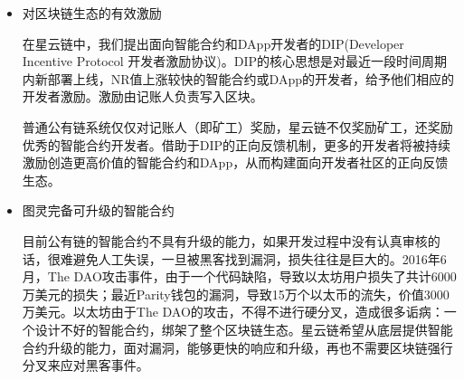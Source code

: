 \begin{itemize}
	\item 对区块链生态的有效激励

在星云链中，我们提出面向智能合约和DApp开发者的DIP(Developer Incentive Protocol 开发者激励协议)。DIP的核心思想是对最近一段时间周期内新部署上线，NR值上涨较快的智能合约或DApp的开发者，给予他们相应的开发者激励。激励由记账人负责写入区块。

普通公有链系统仅仅对记账人（即矿工）奖励，星云链不仅奖励矿工，还奖励优秀的智能合约开发者。借助于DIP的正向反馈机制，更多的开发者将被持续激励创造更高价值的智能合约和DApp，从而构建面向开发者社区的正向反馈生态。

	\item 图灵完备可升级的智能合约

目前公有链的智能合约不具有升级的能力，如果开发过程中没有认真审核的话，很难避免人工失误，一旦被黑客找到漏洞，损失往往是巨大的。2016年6月，The DAO攻击事件，由于一个代码缺陷，导致以太坊用户损失了共计6000万美元的损失；最近Parity钱包的漏洞，导致15万个以太币的流失，价值3000万美元。以太坊由于The DAO的攻击，不得不进行硬分叉，造成很多诟病：一个设计不好的智能合约，绑架了整个区块链生态。星云链希望从底层提供智能合约升级的能力，面对漏洞，能够更快的响应和升级，再也不需要区块链强行分叉来应对黑客事件。

\end{itemize}

